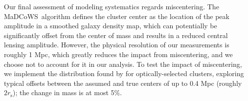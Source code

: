 \documentclass[preprint2]{aastex63}
\newcommand{\madcows}{MaDCoWS}
\begin{document}
Our final assessment of modeling systematics regards miscentering.
The \madcows\ algorithm defines the cluster center as the location of the peak amplitude in a smoothed galaxy density map, which can potentially be significantly offset from the center of mass \citep{george12,viola15} and results in a reduced central lensing amplitude.
However, the physical resolution of our measurements is roughly 1 Mpc, which greatly reduces the impact from miscentering, and we choose not to account for it in our analysis. To test the impact of miscentering, we implement the distribution found by \cite{johnston07} for optically-selected clusters, exploring typical offsets between the assumed and true centers of up to 0.4 Mpc (roughly $2r_\mathrm{s}$); the change in mass is at most 5\%.
\end{document}
